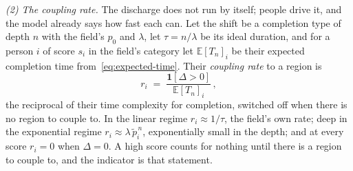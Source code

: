 \documentclass{article}
\begin{document}

\emph{(2) The coupling rate.} The discharge does not run by itself; people drive it, and the model already says how fast each can. Let the shift be a completion type of depth $n$ with the field's $p_0$ and $\lambda$, let $\tau = n/\lambda$ be its ideal duration, and for a person $i$ of score $s_i$ in the field's category let $\mathbb{E}[T_n]_i$ be their expected completion time from~\eqref{eq:expected-time}. Their \emph{coupling rate} to a region is
\begin{equation}\label{eq:coupling}
  r_i \;=\; \frac{\mathbf{1}[\Delta > 0]}{\mathbb{E}[T_n]_i}\,,
\end{equation}
the reciprocal of their time complexity for completion, switched off when there is no region to couple to. In the linear regime $r_i \approx 1/\tau$, the field's own rate; deep in the exponential regime $r_i \approx \lambda\,\widetilde{p}_i^{\,n}$, exponentially small in the depth; and at every score $r_i = 0$ when $\Delta = 0$. A high score counts for nothing until there is a region to couple to, and the indicator is that statement.
\end{document}
